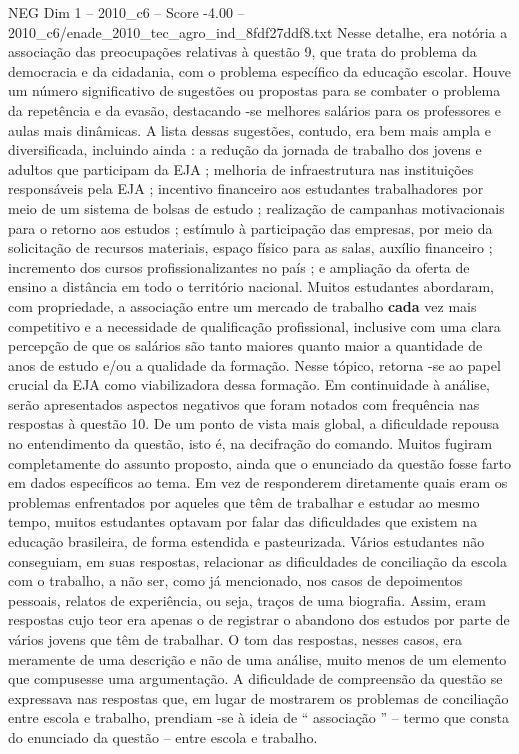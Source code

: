 \begin{textsample}{NEG Dim 1 – 2010\_c6 – Score -4.00 – 2010\_c6/enade\_2010\_tec\_agro\_ind\_8fdf27ddf8.txt}
Nesse detalhe, era notória a associação das preocupações relativas à questão 9, que trata do problema da democracia e da cidadania, com o problema específico da educação escolar.
Houve um número significativo de sugestões ou propostas para se combater o problema da repetência e da evasão, destacando -se melhores salários para os professores e aulas mais dinâmicas.
A lista dessas sugestões, contudo, era bem mais ampla e diversificada, incluindo ainda : a redução da jornada de trabalho dos jovens e adultos que participam da EJA ; melhoria de infraestrutura nas instituições responsáveis pela EJA ; incentivo financeiro aos estudantes trabalhadores por meio de um sistema de bolsas de estudo ; realização de campanhas motivacionais para o retorno aos estudos ; estímulo à participação das empresas, por meio da solicitação de recursos materiais, espaço físico para as salas, auxílio financeiro ; incremento dos cursos profissionalizantes no país ; e ampliação da oferta de ensino a distância em todo o território nacional.
Muitos estudantes abordaram, com propriedade, a associação entre um mercado de trabalho \textbf{cada} vez mais competitivo e a necessidade de qualificação profissional, inclusive com uma clara percepção de que os salários são tanto maiores quanto maior a quantidade de anos de estudo e/ou a qualidade da formação.
Nesse tópico, retorna -se ao papel crucial da EJA como viabilizadora dessa formação.
Em continuidade à análise, serão apresentados aspectos negativos que foram notados com frequência nas respostas à questão 10.
De um ponto de vista mais global, a dificuldade repousa no entendimento da questão, isto é, na decifração do comando.
Muitos fugiram completamente do assunto proposto, ainda que o enunciado da questão fosse farto em dados específicos ao tema.
Em vez de responderem diretamente quais eram os problemas enfrentados por aqueles que têm de trabalhar e estudar ao mesmo tempo, muitos estudantes optavam por falar das dificuldades que existem na educação brasileira, de forma estendida e pasteurizada.
Vários estudantes não conseguiam, em suas respostas, relacionar as dificuldades de conciliação da escola com o trabalho, a não ser, como já mencionado, nos casos de depoimentos pessoais, relatos de experiência, ou seja, traços de uma biografia.
Assim, eram respostas cujo teor era apenas o de registrar o abandono dos estudos por parte de vários jovens que têm de trabalhar.
O tom das respostas, nesses casos, era meramente de uma descrição e não de uma análise, muito menos de um elemento que compusesse uma argumentação.
A dificuldade de compreensão da questão se expressava nas respostas que, em lugar de mostrarem os problemas de conciliação entre escola e trabalho, prendiam -se à ideia de “ associação ” – termo que consta do enunciado da questão – entre escola e trabalho.

\end{textsample}
